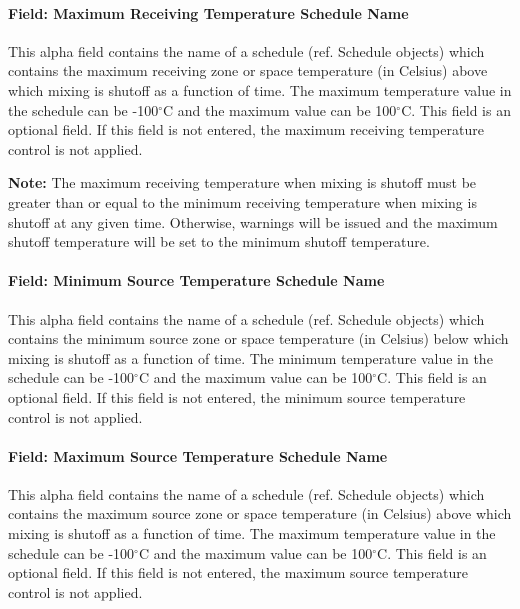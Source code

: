 \paragraph{Field: Maximum Receiving Temperature Schedule Name}\label{field-maximum-zone-temperature-schedule-name}

This alpha field contains the name of a schedule (ref. Schedule objects) which contains the maximum receiving zone or space temperature (in Celsius) above which mixing is shutoff as a function of time. The maximum temperature value in the schedule can be -100$^\circ$C and the maximum value can be 100$^\circ$C. This field is an optional field. If this field is not entered, the maximum receiving temperature control is not applied.

\textbf{Note:} The maximum receiving temperature when mixing is shutoff must be greater than or equal to the minimum receiving temperature when mixing is shutoff at any given time. Otherwise, warnings will be issued and the maximum shutoff temperature will be set to the minimum shutoff temperature.

\paragraph{Field: Minimum Source Temperature Schedule Name}\label{field-minimum-source-zone-temperature-schedule-name}

This alpha field contains the name of a schedule (ref. Schedule objects) which contains the minimum source zone or space temperature (in Celsius) below which mixing is shutoff as a function of time. The minimum temperature value in the schedule can be -100$^\circ$C and the maximum value can be 100$^\circ$C. This field is an optional field. If this field is not entered, the minimum source temperature control is not applied.

\paragraph{Field: Maximum Source Temperature Schedule Name}\label{field-maximum-source-zone-temperature-schedule-name}

This alpha field contains the name of a schedule (ref. Schedule objects) which contains the maximum source zone or space temperature (in Celsius) above which mixing is shutoff as a function of time. The maximum temperature value in the schedule can be -100$^\circ$C and the maximum value can be 100$^\circ$C. This field is an optional field. If this field is not entered, the maximum source temperature control is not applied.

